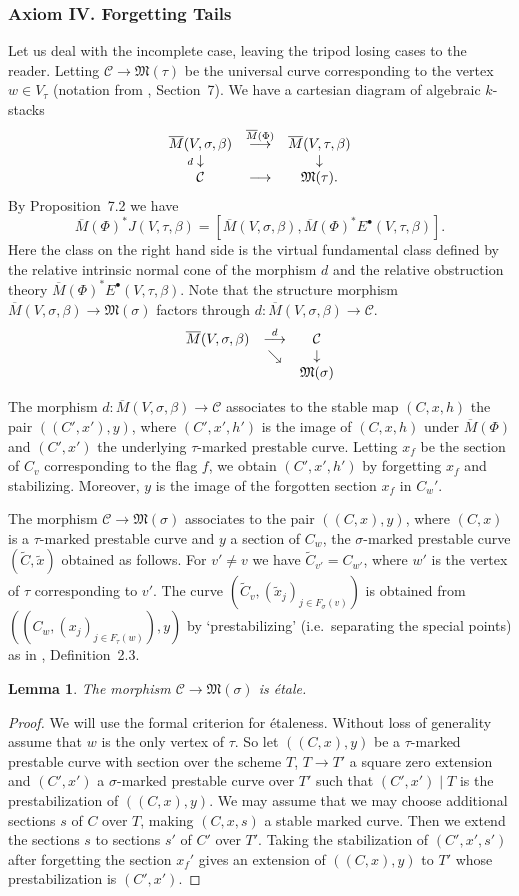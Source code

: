 \documentclass[11pt]{article}
\newcommand{\MM}{\mathfrak{M}}
\newcommand{\cC}{\mathcal{C}}
\newcommand{\com}{^{\scriptscriptstyle\bullet}}
\newcommand{\comdia}[9]{
\begin{array}{ccc}
#1 & \stackrel{#2}{\longrightarrow} & #3 \\
\ldiag{#4} & #5 & \rdiag{#6} \\
#7 & \stackrel{#8}{\longrightarrow} & #9
\end{array}}
\newcommand{\comtri}[6]{
\begin{array}{ccc}
#1 & \stackrel{#2}{\longrightarrow} & #3         \\
   & \sediag{#4}                    & \rdiag{#5} \\
   &                                & #6
\end{array}}
\newcommand{\ldiag}[1]{\makebox[0cm]{\({\scriptstyle#1}\downarrow\phantom{\scriptstyle#1}\)}}
\newcommand{\ol}{\overline}
\newcommand{\rdiag}[1]{\makebox[0cm]{\(\phantom{\scriptstyle#1}\downarrow{\scriptstyle#1}\)}}
\newcommand{\resto}{{ \mid }}
\newcommand{\sediag}[1]{\makebox[0cm]{\({\scriptstyle#1}\searrow\phantom{\scriptstyle#1}\)}}
\renewcommand{\tilde}{\widetilde}
\newcommand{\upst}{^{\ast}}
\theoremstyle{plain}
\newtheorem{lem}[prop]{Lemma}
\theoremstyle{remark}
\newenvironment{pf}{\begin{proof}}{\end{proof}}
\theoremstyle{plain}
\theoremstyle{definition}
\theoremstyle{remark}
\begin{document}
\subsubsection{{\sc Axiom IV.} Forgetting Tails}

Let us deal with the incomplete case, leaving the tripod losing cases
to the reader.
Letting \(\cC\to\MM(\tau)\) be the universal curve corresponding to the
vertex \(w\in V_{\tau}\) (notation from \cite{BM}, Section~7). We have a
cartesian diagram of algebraic \(k\)-stacks
\[
\comdia{\ol{M}(V,\sigma,\beta)}{\ol{M}(\Phi)}{\ol{M}(V,\tau,\beta)}{
d}{ }{ }{\cC}{}{\MM(\tau).}
\]
By \cite{BF} Proposition~7.2 we have
\[
\ol{M}(\Phi)\upst
J(V,\tau,\beta) = [\ol{M}(V,\sigma,\beta),\ol{M}(\Phi)\upst
E\com(V,\tau,\beta)].
\]
Here the class on the right hand side is the virtual fundamental class
defined by the relative intrinsic normal cone of the morphism \(d\) and
the relative obstruction theory \(\ol{M}(\Phi)\upst
E\com(V,\tau,\beta)\).
Note that the structure morphism
\(\ol{M}(V,\sigma,\beta)\to\MM(\sigma)\) factors through
\(d:\ol{M}(V,\sigma,\beta)\to\cC\).
\[
\comtri{\ol{M}(V,\sigma,\beta)}{d}{\cC}{}{}{\MM(\sigma)}
\]

The morphism \(d:\ol{M}(V,\sigma,\beta)\to\cC\) associates to the stable
map \((C,x,h)\) the pair \(((C',x'),y)\), where \((C',x',h')\) is the image
of \((C,x,h)\) under \(\ol{M}(\Phi)\) and \((C',x')\) the underlying
\(\tau\)-marked prestable curve. Letting \(x_f\) be the section of \(C_v\)
corresponding to the flag \(f\), we obtain \((C',x',h')\) by forgetting
\(x_f\) and stabilizing. Moreover, \(y\) is the image of the forgotten
section \(x_f\) in \(C_w'\).

The morphism \(\cC\to\MM(\sigma)\) associates to the pair \(((C,x),y)\),
where \((C,x)\) is a \(\tau\)-marked prestable curve and \(y\) a section of
\(C_w\), the \(\sigma\)-marked prestable curve \((\tilde{C},\tilde{x})\)
obtained as follows. For \(v'\not=v\) we have \(\tilde{C}_{v'}=C_{w'}\),
where \(w'\) is the vertex of \(\tau\) corresponding to \(v'\). The curve
\((\tilde{C}_v,(\tilde{x}_j)_{j\in F_{\sigma}(v)})\) is obtained from
\(((C_w,(x_j)_{j\in F_{\tau}(w)}),y)\) by `prestabilizing' (i.e.\
separating the special points) as in \cite{knudsen}, Definition~2.3.

\begin{lem}\label{loem}
The morphism \(\cC\to\MM(\sigma)\) is \'etale.
\end{lem}
\begin{pf}
We will use the formal criterion for \'etaleness. Without loss of
generality assume that \(w\) is the only vertex of \(\tau\). So let
\(((C,x),y)\) be a \(\tau\)-marked prestable curve with section over the
scheme \(T\), \(T\to T'\) a square zero extension and \((C',x')\) a
\(\sigma\)-marked prestable curve over \(T'\) such that \((C',x')\resto T\)
is the prestabilization of \(((C,x),y)\). We may assume that we may
choose additional sections \(s\) of \(C\) over \(T\), making \((C,x,s)\) a
stable marked curve. Then we extend the sections \(s\) to sections \(s'\)
of \(C'\) over \(T'\). Taking the stabilization of \((C',x',s')\) after
forgetting the section \(x_f'\) gives an extension of \(((C,x),y)\) to
\(T'\) whose prestabilization is \((C',x')\).
\end{pf}
\end{document}
